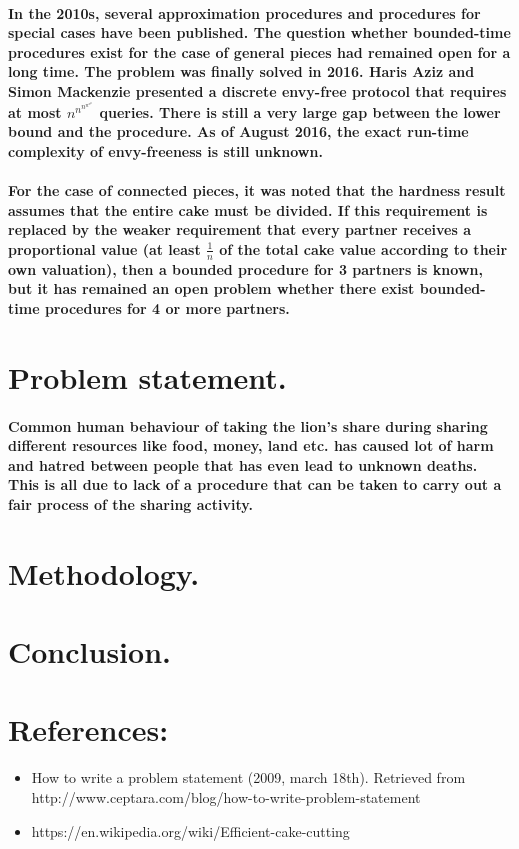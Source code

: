 \documentclass[12pt]{report}
\begin{document}
	\paragraph{In the 2010s, several approximation procedures and procedures for special cases have been published. The question whether bounded-time procedures exist for the case of general pieces had remained open for a long time. The problem was finally solved in 2016. Haris Aziz and Simon Mackenzie presented a discrete envy-free protocol that requires \\
		at most ${\displaystyle n^{n^{n^{n^{n^{n}}}}}}$ queries. There is still a very large gap between the lower bound and the procedure. As of August 2016, the exact run-time complexity of envy-freeness is still unknown. }
	\paragraph{For the case of connected pieces, it was noted that the hardness result assumes that the entire cake must be divided. If this requirement is replaced by the weaker requirement that every partner receives a proportional value (at least $\frac{1}{n}$ of the total cake value according to their own valuation), then a bounded procedure for 3 partners is known, but it has remained an open problem whether there exist bounded-time procedures for 4 or more partners.
	}
	\section{Problem statement.}
	\paragraph{Common human behaviour of taking the lion's share during sharing different resources like food, money, land etc. has caused lot of harm and hatred between people that has even lead to unknown deaths. This is all due to lack of a procedure that can be taken to carry out a fair process of the sharing activity. }

	\section{Methodology.}
	\paragraph{}
	\section{Conclusion.}
	\section{References:}
	\begin{itemize}
		\item {How to write a problem statement (2009, march 18th). Retrieved from   http://www.ceptara.com/blog/how-to-write-problem-statement}
		
		\item {https://en.wikipedia.org/wiki/Efficient-cake-cutting}
	\end{itemize}
	
	
	
\end{document}
